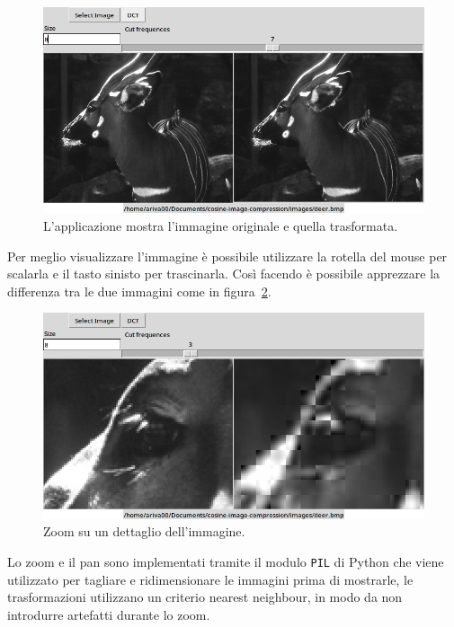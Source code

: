 \documentclass[a4paper, 12pt]{article}
\begin{document}
\begin{figure}[h]
  \includegraphics[width=\textwidth]{./imgs/after-transform.png}
  \caption{L'applicazione mostra l'immagine originale e quella trasformata.}
  \label{fig:after-transform}
\end{figure}

Per meglio visualizzare l'immagine è possibile utilizzare la rotella del mouse 
per scalarla e il tasto sinisto per trascinarla. Così facendo è possibile
apprezzare la differenza tra le due immagini come in 
figura~\ref{fig:zoomed-detail}.

\begin{figure}[h]
  \includegraphics[width=\textwidth]{./imgs/zoomed-detail.png}
  \caption{Zoom su un dettaglio dell'immagine.}
  \label{fig:zoomed-detail}
\end{figure}

Lo zoom e il pan sono implementati tramite il modulo \texttt{PIL} di Python che
viene utilizzato per tagliare e ridimensionare le immagini prima di mostrarle, 
le trasformazioni utilizzano un criterio nearest neighbour, in modo da non 
introdurre artefatti durante lo zoom.
\end{document}
